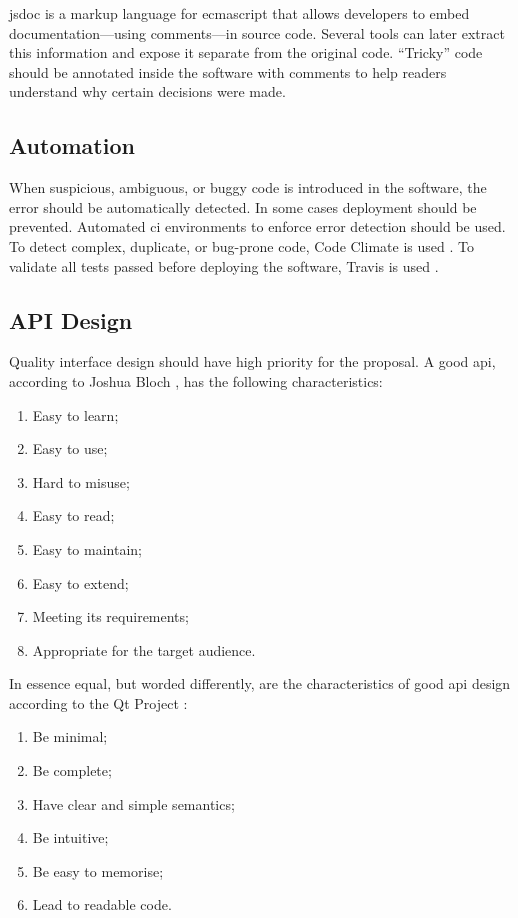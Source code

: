 \gls{jsdoc} \autocite{google.com-clojure-compiler-jsdoc} is a markup language
  for \gls{ecmascript} that allows developers to embed documentation---using
  comments---in source code.
Several tools can later extract this information and expose it separate
  from the original code.
``Tricky'' code should be annotated inside the software with comments to help
  readers understand why certain decisions were made.

\subsection{Automation}\label{automation}

When suspicious, ambiguous, or buggy code is introduced in the software, the
  error should be automatically detected.
In some cases deployment should be prevented.
Automated \gls{ci} environments to enforce error detection should be used.
To detect complex, duplicate, or bug-prone code, Code Climate is used
  \autocite{codeclimate.com}.
To validate all tests passed before deploying the software, Travis is used
  \autocite{travis-ci.org}.

\subsection{API Design}\label{design-1}

Quality interface design should have high priority for the proposal.
A good \gls{api}, according to Joshua Bloch
  \autocite*{bloch-joshua-how-design-good-api-why-matters}, has the following
  characteristics:

\begin{enumerate}
\item Easy to learn;
\item Easy to use;
\item Hard to misuse;
\item Easy to read;
\item Easy to maintain;
\item Easy to extend;
\item Meeting its requirements;
\item Appropriate for the target audience.
\end{enumerate}

In essence equal, but worded differently, are the characteristics of good
  \gls{api} design according to the Qt Project
  \autocite*{qt-project.org-api-design-principles}:

\begin{enumerate}
\item Be minimal;
\item Be complete;
\item Have clear and simple semantics;
\item Be intuitive;
\item Be easy to memorise;
\item Lead to readable code.
\end{enumerate}

